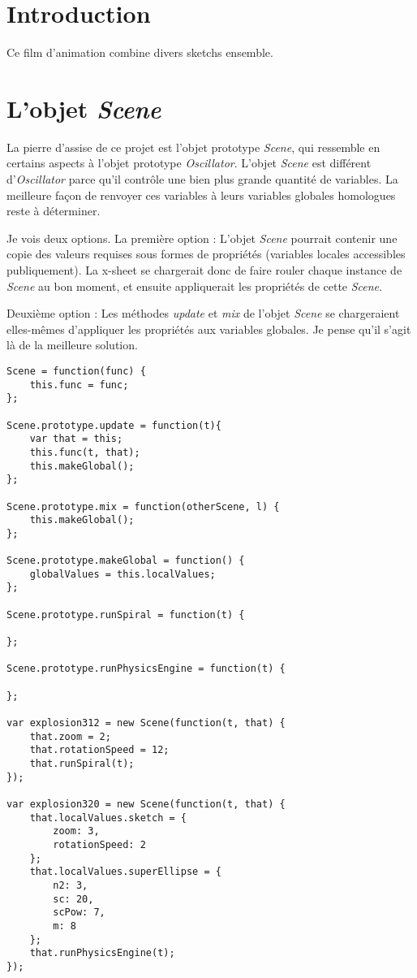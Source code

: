 
\section{Introduction}
Ce film d'animation combine divers sketchs ensemble.

\section{L'objet \textit{Scene}}
La pierre d'assise de ce projet est l'objet prototype \textit{Scene}, qui ressemble en certains aspects à l'objet prototype \textit{Oscillator}. L'objet \textit{Scene} est différent d'\textit{Oscillator} parce qu'il contrôle une bien plus grande quantité de variables. La meilleure façon de renvoyer ces variables à leurs variables globales homologues reste à déterminer.

Je vois deux options. 
La première option : L'objet \textit{Scene} pourrait contenir une copie des valeurs requises sous formes de propriétés (variables locales accessibles publiquement). La x-sheet se chargerait donc de faire rouler chaque instance de \textit{Scene} au bon moment, et ensuite appliquerait les propriétés de cette \textit{Scene}.

Deuxième option : Les méthodes \textit{update} et \textit{mix} de l'objet \textit{Scene} se chargeraient elles-mêmes d'appliquer les propriétés aux variables globales. Je pense qu'il s'agit là de la meilleure solution.


\begin{lstlisting}
Scene = function(func) {
    this.func = func;
};

Scene.prototype.update = function(t){
    var that = this;
    this.func(t, that);
    this.makeGlobal();
};

Scene.prototype.mix = function(otherScene, l) {
    this.makeGlobal();
};

Scene.prototype.makeGlobal = function() {
    globalValues = this.localValues;
};

Scene.prototype.runSpiral = function(t) {

};

Scene.prototype.runPhysicsEngine = function(t) {

};

var explosion312 = new Scene(function(t, that) {
    that.zoom = 2;
    that.rotationSpeed = 12;
    that.runSpiral(t);
});

var explosion320 = new Scene(function(t, that) {
    that.localValues.sketch = {
        zoom: 3,
        rotationSpeed: 2
    };
    that.localValues.superEllipse = {
        n2: 3,
        sc: 20,
        scPow: 7,
        m: 8
    };
    that.runPhysicsEngine(t);
});

\end{lstlisting}

